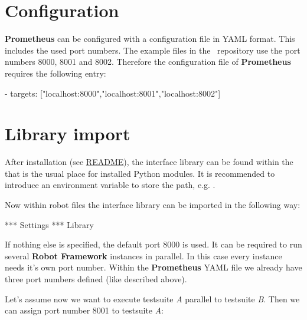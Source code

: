 
\newpage

\section{Configuration}

\textbf{Prometheus} can be configured with a configuration file in YAML format. This includes the used port numbers. The example files in the \repo\ repository use
the port numbers 8000, 8001 and 8002. Therefore the configuration file of \textbf{Prometheus} requires the following entry:

\begin{pythoncode}
- targets: ["localhost:8000","localhost:8001","localhost:8002"]
\end{pythoncode}


\section{Library import}

After installation (see \href{https://github.com/test-fullautomation/robotframework-prometheus/blob/develop/README.rst}{README}), the interface library
can be found within the  that is the usual place for installed Python modules. It is recommended to introduce an environment variable to store the
 path, e.g. .

Now within robot files the interface library can be imported in the following way:

\begin{robotcode}
*** Settings ***
Library    %
\end{robotcode}

If nothing else is specified, the default port 8000 is used. It can be required to run several \textbf{Robot Framework} instances in parallel. In this case
every instance needs it's own port number. Within the \textbf{Prometheus} YAML file we already have three port numbers defined (like described above).

Let's assume now we want to execute testsuite \textit{A} parallel to testsuite \textit{B}. Then we can assign port number 8001 to testsuite \textit{A}:

